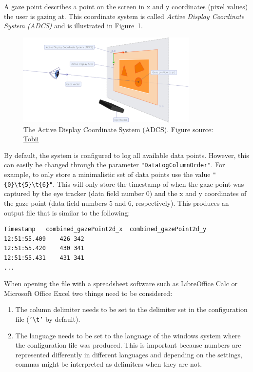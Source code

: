 \documentclass[a4paper,oneside]{book}
\begin{document}
A gaze point describes a point on the screen in x and y coordinates (pixel values) the user is gazing at.
This coordinate system is called \emph{Active Display Coordinate System (ADCS)} and is illustrated in Figure~\ref{fig.adcs}.
\begin{figure}[ht]
    \centering
    \includegraphics[width=0.8\textwidth]{adcs.png}
    \caption{The Active Display Coordinate System (ADCS). Figure source: \href{http://developer.tobiipro.com/commonconcepts/coordinatesystems.html}{Tobii}}
    \label{fig.adcs}
\end{figure}

By default, the system is configured to log all available data points.
However, this can easily be changed through the parameter \texttt{"DataLogColumnOrder"}.
For example, to only store a minimalistic set of data points use the value \texttt{"\{0\}\textbackslash t\{5\}\textbackslash t\{6\}"}.
This will only store the timestamp of when the gaze point was captured by the eye tracker (data field number 0) and the x and y coordinates of the gaze point (data field numbers 5 and 6, respectively).
This produces an output file that is similar to the following:
\lstset{columns=flexible}
\lstset{keepspaces=true}
\begin{lstlisting}
Timestamp   combined_gazePoint2d_x  combined_gazePoint2d_y
12:51:55.409    426 342
12:51:55.420    430 341
12:51:55.431    431 341
...
\end{lstlisting}

When opening the file with a spreadsheet software such as LibreOffice Calc or Microsoft Office Excel two things need to be considered:
\begin{enumerate}
    \item The column delimiter needs to be set to the delimiter set in the configuration file (\texttt{'\textbackslash t'} by default).
    \item The language needs to be set to the language of the windows system where the configuration file was produced.
        This is important because numbers are represented differently in different languages and depending on the settings, commas might be interpreted as delimiters when they are not.
\end{enumerate}
\end{document}
